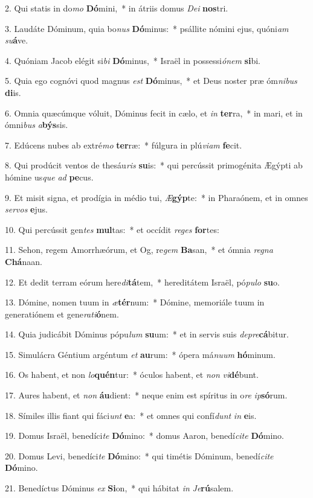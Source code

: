 2. Qui statis in do\textit{mo} \textbf{Dó}mini,~*  in átriis domus \textit{De}\textit{i} \textbf{nos}tri.\

3. Laudáte Dóminum, quia bo\textit{nus} \textbf{Dó}minus:~*  psállite nómini ejus, quóni\textit{am} \textit{su}\textbf{á}ve.\

4. Quóniam Jacob elégit si\textit{bi} \textbf{Dó}minus,~*  Israël in possessi\textit{ó}\textit{nem} \textbf{si}bi.\

5. Quia ego cognóvi quod magnus \textit{est} \textbf{Dó}minus,~*  et Deus noster præ óm\textit{ni}\textit{bus} \textbf{di}is.\

6. Omnia quæcúmque vóluit, Dóminus fecit in cælo, et \textit{in} \textbf{ter}ra,~*  in mari, et in ómni\textit{bus} \textit{a}\textbf{býs}sis.\

7. Edúcens nubes ab extré\textit{mo} \textbf{ter}ræ:~*  fúlgura in plú\textit{vi}\textit{am} \textbf{fe}cit.\

8. Qui prodúcit ventos de thesáu\textit{ris} \textbf{su}is:~*  qui percússit primogénita Ægýpti ab hómine us\textit{que} \textit{ad} \textbf{pe}cus.\

9. Et misit signa, et prodígia in médio tui, \textit{Æ}\textbf{gýp}te:~*  in Pharaónem, et in omnes \textit{ser}\textit{vos} \textbf{e}jus.\

10. Qui percússit gen\textit{tes} \textbf{mul}tas:~*  et occídit \textit{re}\textit{ges} \textbf{for}tes:\

11. Sehon, regem Amorrhæórum, et Og, re\textit{gem} \textbf{Ba}san,~*  et ómnia \textit{re}\textit{gna} \textbf{Chá}naan.\

12. Et dedit terram eórum here\textit{di}\textbf{tá}tem,~*  hereditátem Israël, pó\textit{pu}\textit{lo} \textbf{su}o.\

13. Dómine, nomen tuum in \textit{æ}\textbf{tér}num:~*  Dómine, memoriále tuum in generatiónem et gene\textit{ra}\textit{ti}\textbf{ó}nem.\

14. Quia judicábit Dóminus pópu\textit{lum} \textbf{su}um:~*  et in servis suis \textit{de}\textit{pre}\textbf{cá}bitur.\

15. Simulácra Géntium argéntum \textit{et} \textbf{au}rum:~*  ópera má\textit{nu}\textit{um} \textbf{hó}minum.\

16. Os habent, et non \textit{lo}\textbf{quén}tur:~*  óculos habent, et \textit{non} \textit{vi}\textbf{dé}bunt.\

17. Aures habent, et \textit{non} \textbf{áu}dient:~*  neque enim est spíritus in o\textit{re} \textit{ip}\textbf{só}rum.\

18. Símiles illis fiant qui fáci\textit{unt} \textbf{e}a:~*  et omnes qui confí\textit{dunt} \textit{in} \textbf{e}is.\

19. Domus Israël, benedíci\textit{te} \textbf{Dó}mino:~*  domus Aaron, benedí\textit{ci}\textit{te} \textbf{Dó}mino.\

20. Domus Levi, benedíci\textit{te} \textbf{Dó}mino:~*  qui timétis Dóminum, benedí\textit{ci}\textit{te} \textbf{Dó}mino.\

21. Benedíctus Dóminus \textit{ex} \textbf{Si}on,~*  qui hábitat \textit{in} \textit{Je}\textbf{rú}salem.\

